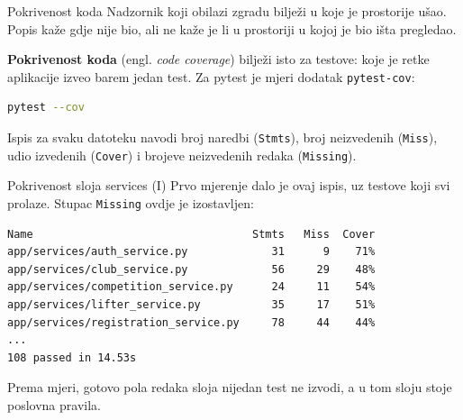 
\begin{frame}[fragile]{Pokrivenost koda}
Nadzornik koji obilazi zgradu bilježi u koje je prostorije ušao. Popis kaže gdje nije bio, ali ne kaže je li u prostoriji u kojoj je bio išta pregledao.

\vspace{0.7em}
\textbf{Pokrivenost koda} (engl. \emph{code coverage}) bilježi isto za testove: koje je retke aplikacije izveo barem jedan test. Za pytest je mjeri dodatak \texttt{pytest-cov}:

\begin{lstlisting}[language=bash]
pytest --cov
\end{lstlisting}

\vspace{0.3em}
Ispis za svaku datoteku navodi broj naredbi (\texttt{Stmts}), broj neizvedenih (\texttt{Miss}), udio izvedenih (\texttt{Cover}) i brojeve neizvedenih redaka (\texttt{Missing}).
\end{frame}

\begin{frame}[fragile]{Pokrivenost sloja services (I)}
Prvo mjerenje dalo je ovaj ispis, uz testove koji svi prolaze. Stupac \texttt{Missing} ovdje je izostavljen:

\begin{lstlisting}[keepspaces=true]
Name                                  Stmts   Miss  Cover
app/services/auth_service.py             31      9    71%
app/services/club_service.py             56     29    48%
app/services/competition_service.py      24     11    54%
app/services/lifter_service.py           35     17    51%
app/services/registration_service.py     78     44    44%
...
108 passed in 14.53s
\end{lstlisting}

\vspace{0.4em}
Prema mjeri, gotovo pola redaka sloja  nijedan test ne izvodi, a u tom sloju stoje poslovna pravila.
\end{frame}

